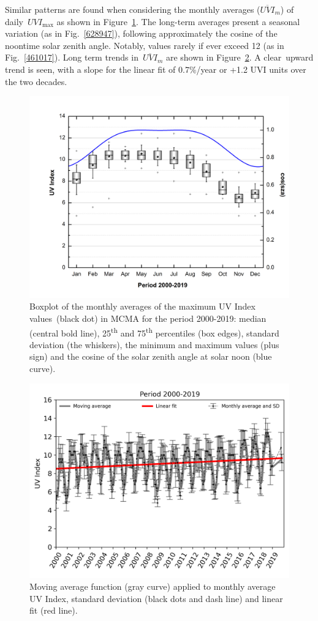 \documentclass[10pt]{article}
\begin{document}
Similar patterns are found when considering the monthly averages
(\(\overline{UVI}_m\)) of daily~\(UVI_{\max}\) as shown in
Figure~{\ref{310112}}. The long-term averages present a
seasonal variation (as in Fig.~{\ref{628947}}),
following approximately the cosine of the noontime solar zenith angle.
Notably, values rarely if ever exceed 12 (as in
Fig.~{\ref{461017}}). Long term trends
in~\(\overline{UVI}_m\) are shown in
Figure~{\ref{185758}}. A clear~upward trend is seen,
with a slope for the linear fit of 0.7\%/year or +1.2 UVI units over the
two decades.
\begin{figure}[H]
\begin{center}
\includegraphics[width=0.70\columnwidth]{figures/Boxplotcos/Boxplotcos}
\caption{{Boxplot of the monthly averages of the maximum UV Index values~(black
dot) in MCMA for the period 2000-2019: median (central bold line),
25\textsuperscript{th} and 75\textsuperscript{th} percentiles (box
edges), standard deviation (the whiskers), the minimum and maximum
values (plus sign) and the cosine of the solar zenith angle at solar
noon (blue curve).
{\label{310112}}%
}}
\end{center}
\end{figure}
\begin{figure}[H]
\begin{center}
\includegraphics[width=0.70\columnwidth]{figures/CloudDaily/UVyearlyError}
\caption{{Moving average function (gray curve) applied to monthly average UV
Index, standard deviation (black dots and dash line) and linear fit (red
line).
{\label{185758}}%
}}
\end{center}
\end{figure}
\end{document}
